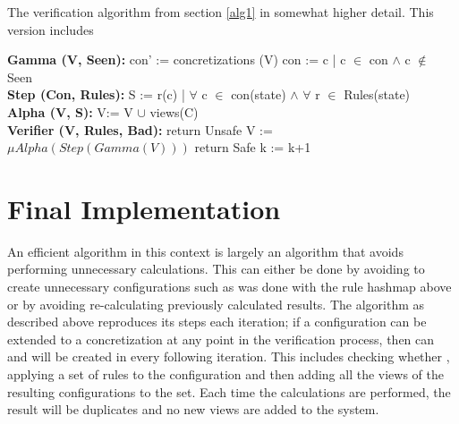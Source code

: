 \begin{algorithm}
  \caption{The verification algorithm from section \ref{alg1} in somewhat higher detail. This version includes }\label{euclid}
  \begin{algorithmic}[1]
    \State \textbf{Gamma (V, Seen):}
    \State \hspace{6 mm} con' := concretizations (V)
    \State \hspace{6 mm} con  := c | c $\in$ con $\land$ c $\notin$ Seen
    \\
    \State \textbf{Step (Con, Rules):}
    \State \hspace{6 mm} S := r(c) | $\forall$ c $\in$ con(state) $\land$ $\forall$ r $\in$ Rules(state)
    \EndFor
    \\
    \State \textbf{Alpha (V, S):}
    \State \hspace{6 mm} V:= V $\cup$ views(C)
    \\
    \State \textbf{Verifier (V, Rules, Bad):}
        \State return Unsafe
        \EndIf
        \State V := $\mu Alpha(Step(Gamma(V)))$
        \State return Safe
        \EndIf
        \State k := k+1
      \EndFor
\end{algorithmic}
\end{algorithm}



\newpage
\section{Final Implementation}
An efficient algorithm in this context is largely an algorithm that avoids performing unnecessary calculations. This can either be done by avoiding to create unnecessary configurations such as was done with the rule hashmap above or by avoiding re-calculating previously calculated results. The algorithm as described above reproduces its steps each iteration; if a configuration  can be extended to a concretization  at any point in the verification process, then  can and will be created in every following iteration. This includes checking whether , applying a set of rules to the configuration and then adding all the views of the resulting configurations to the set. Each time the calculations are performed, the result will be duplicates and no new views are added to the system.

